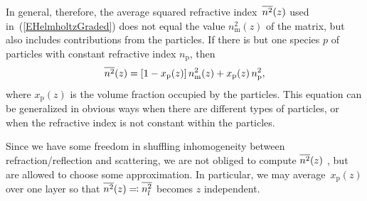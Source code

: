 In general, therefore, the average squared refractive index~$\overline{n^2}(z)$
used in~(\ref{EHelmholtzGraded})
does not equal the value $n_\text{m}^2(z)$ of the matrix,
but also includes contributions from the particles.
If there is but one species $p$ of particles
%
with constant refractive index $n_\text{p}$,
then
\begin{equation}\label{Enzx}
  \overline{n^2}(z) = [1-x_\text{p}(z)]\,n_\text{m}^2(z) + x_\text{p}(z)\, n_\text{p}^2,
\end{equation}
where $x_\text{p}(z)$ is the volume fraction occupied by the particles.
This equation can be generalized in obvious ways
when there are different types of particles,
or when the refractive index is not constant within the particles.


Since we have some freedom in shuffling inhomogeneity
between refraction/reflection and scattering,
we are not obliged to compute $\overline{n^2}(z)$ ,
but are allowed to choose some approximation.
In particular, we may average~$x_\text{p}(z)$
over one layer
so that $\overline{n^2}(z)\eqqcolon \overline{n_l^2}$ becomes $z$ independent.


